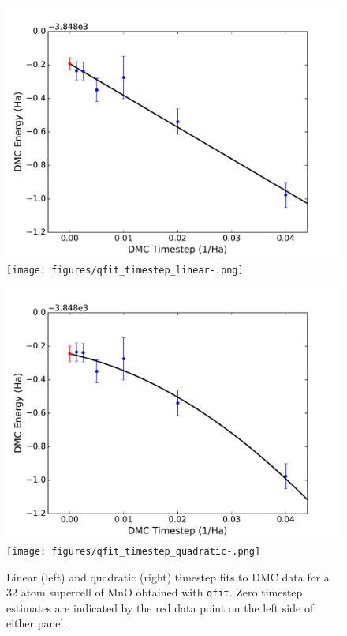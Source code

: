 \begin{figure}
  \centering
  \parbox{0.47\textwidth}{%
    \ifpdf%
\includegraphics[trim=0mm 0mm 4mm 0mm,clip,width=\linewidth]{figures/qfit_timestep_linear.pdf}%
\else%
\texttt{[image: figures/qfit\_timestep\_linear-.png]}%
\fi%
  }%
  \qquad%
  \begin{minipage}{0.47\textwidth}%
        \ifpdf%
\includegraphics[trim=2mm 0mm 4mm 0mm,clip,width=\linewidth]{figures/qfit_timestep_quadratic.pdf}%
\else%
\texttt{[image: figures/qfit\_timestep\_quadratic-.png]}%
\fi%
  \end{minipage}%
  \caption{Linear (left) and quadratic (right) timestep fits to DMC data for a 32 atom supercell of MnO obtained with \texttt{qfit}.  Zero timestep estimates are indicated by the red data point on the left side of either panel.}
  \label{fig:qfit_timestep}
\end{figure}

